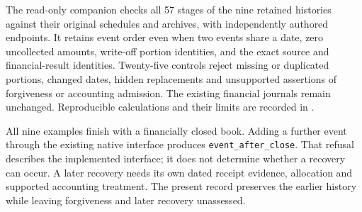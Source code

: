 The read-only companion checks all 57 stages of the nine retained histories
against their original schedules and archives, with independently authored
endpoints. It retains event order even when two events share a date, zero
uncollected amounts, write-off portion identities, and the exact source and
financial-result identities. Twenty-five controls reject missing or duplicated
portions, changed dates, hidden replacements and unsupported assertions of
forgiveness or accounting admission. The existing financial journals remain
unchanged. Reproducible calculations and their limits are recorded in
.

All nine examples finish with a financially closed book. Adding a further event
through the existing native interface produces \texttt{event\_after\_close}.
That refusal describes the implemented interface; it does not determine whether
a recovery can occur. A later recovery needs its own dated receipt evidence,
allocation and supported accounting treatment. The present record preserves
the earlier history while leaving forgiveness and later recovery unassessed.
